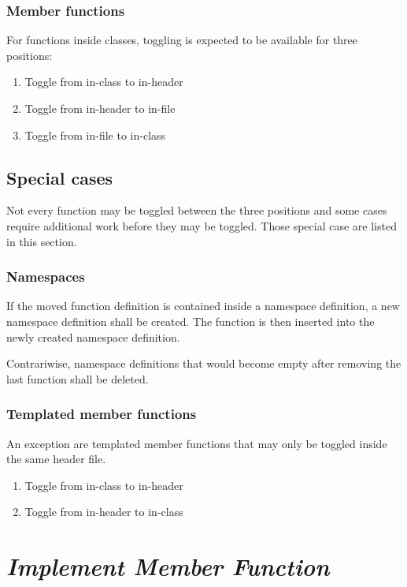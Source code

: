 \subsubsection{Member functions}
For functions inside classes, toggling is expected to be available for three 
positions:
\begin{enumerate}
\item Toggle from in-class to in-header
\item Toggle from in-header to in-file
\item Toggle from in-file to in-class
\end{enumerate}

\subsection{Special cases}

Not every function may be toggled between the three positions and some cases 
require additional work before they may be toggled. Those special case are 
listed in this section.

\subsubsection{Namespaces}

If the moved function definition is contained inside a namespace definition, a 
new namespace definition shall be created. The function is then inserted into 
the newly created namespace definition.

Contrariwise, namespace definitions that would become empty after removing the 
last function shall be deleted.

\subsubsection{Templated member functions}

An exception are templated member functions that may only be toggled inside the 
same header file.
\begin{enumerate}
\item Toggle from in-class to in-header
\item Toggle from in-header to in-class
\end{enumerate}

\section{\textit{Implement Member Function}}

